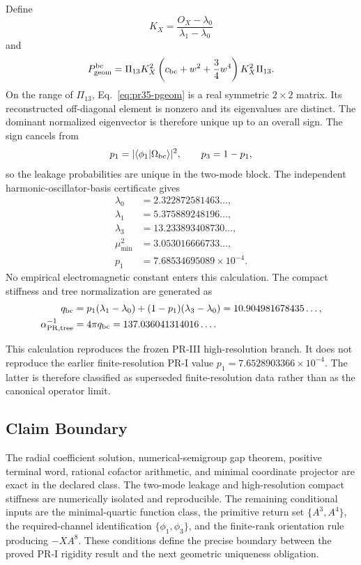 Define
\begin{equation}
K_X
=
\frac{O_X-\lambda_0}{\lambda_1-\lambda_0}
\end{equation}
and
\begin{equation}
P_{\rm geom}^{\rm bc}
=
\Pi_{13}K_X^2
\left(c_{\rm bc}+w^2+\frac34w^4\right)
K_X^2\Pi_{13}.
\label{eq:pr35-pgeom}
\end{equation}
On the range of \(\Pi_{13}\), Eq.~\eqref{eq:pr35-pgeom} is a real symmetric $2\times2$ matrix.  Its reconstructed off-diagonal element is nonzero and its eigenvalues are distinct.  The dominant normalized eigenvector is therefore unique up to an overall sign.  The sign cancels from
\begin{equation}
p_1
=
|\langle\phi_1|\Omega_{\rm bc}\rangle|^2,
\qquad
p_3=1-p_1,
\end{equation}
so the leakage probabilities are unique in the two-mode block. The independent harmonic-oscillator-basis certificate gives
\begin{align}
\lambda_0&=2.322872581463\ldots,\\
\lambda_1&=5.375889248196\ldots,\\
\lambda_3&=13.233893408730\ldots,\\
\mu_{\min}^2&=3.053016666733\ldots,\\
p_1&=7.68534695089\times10^{-4}.
\end{align}
No empirical electromagnetic constant enters this calculation.  The compact
stiffness and tree normalization are generated as
\begin{align}
q_{\rm bc}
&=
p_1(\lambda_1-\lambda_0)
+(1-p_1)(\lambda_3-\lambda_0)
=10.904981678435\ldots,\\
\alpha_{\rm PR,tree}^{-1}
&=4\pi q_{\rm bc}
=137.036041314016\ldots .
\label{eq:pr35-alpha-tree-regenerated}
\end{align}

This calculation reproduces the frozen PR-III high-resolution branch.  It
does not reproduce the earlier finite-resolution PR-I value
\(p_1=7.6528903366\times10^{-4}\).  The latter is therefore classified as
superseded finite-resolution data rather than as the canonical operator limit.

\subsection{Claim Boundary}
\label{subsec:pr35-pr1-rigidity-boundary}

The radial coefficient solution, numerical-semigroup gap theorem, positive
terminal word, rational cofactor arithmetic, and minimal coordinate projector
are exact in the declared class.  The two-mode leakage and high-resolution
compact stiffness are numerically isolated and reproducible.  The remaining
conditional inputs are the minimal-quartic function class, the primitive return
set \(\{A^3,A^4\}\), the required-channel identification
\(\{\phi_1,\phi_3\}\), and the finite-rank orientation rule producing
\(-XA^8\).  These conditions define the precise boundary between the proved
PR-I rigidity result and the next geometric uniqueness obligation.
